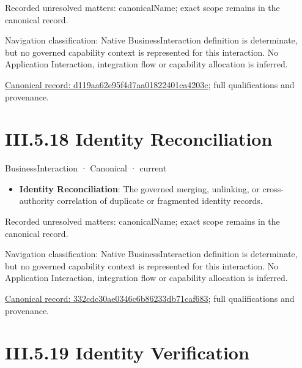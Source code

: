 {\small Recorded unresolved matters: canonicalName; exact scope remains in the canonical record.}\par
{\small Navigation classification: Native BusinessInteraction definition is determinate, but no governed capability context is represented for this interaction. No Application Interaction, integration flow or capability allocation is inferred.}\par
{\footnotesize \href{../../../../../../../continuum/business/business-interaction/d119aa62e95f4d7aa01822401ca4203c.md}{Canonical record: d119aa62e95f4d7aa01822401ca4203c}; full qualifications and provenance.}\par
\section*{III.5.18 Identity Reconciliation}
\label{navigation:III.5.18}

\label{element:332cdc30ae0346c6b86233db71caf683}
{\small BusinessInteraction · Canonical · current}\par

\begin{itemize}


\item \textbf{Identity Reconciliation}: The governed merging, unlinking, or cross-authority correlation of duplicate or fragmented identity records.

\end{itemize}

{\small Recorded unresolved matters: canonicalName; exact scope remains in the canonical record.}\par
{\small Navigation classification: Native BusinessInteraction definition is determinate, but no governed capability context is represented for this interaction. No Application Interaction, integration flow or capability allocation is inferred.}\par
{\footnotesize \href{../../../../../../../continuum/business/business-interaction/332cdc30ae0346c6b86233db71caf683.md}{Canonical record: 332cdc30ae0346c6b86233db71caf683}; full qualifications and provenance.}\par
\section*{III.5.19 Identity Verification}
\label{navigation:III.5.19}

